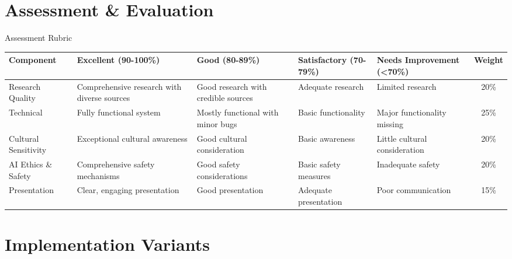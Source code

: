 \documentclass[aspectratio=169]{beamer}
\begin{document}
\section{Assessment \& Evaluation}

\begin{frame}{Assessment Rubric}
    \begin{table}
        \centering
        \tiny
        \begin{tabular}{|p{1.8cm}|p{1.8cm}|p{1.8cm}|p{1.8cm}|p{1.8cm}|c|}
            \hline
            \textbf{Component} & \textbf{Excellent (90-100\%)} & \textbf{Good (80-89\%)} & \textbf{Satisfactory (70-79\%)} & \textbf{Needs Improvement (<70\%)} & \textbf{Weight} \\
            \hline
            Research Quality & Comprehensive research with diverse sources & Good research with credible sources & Adequate research & Limited research & 20\% \\
            \hline
            Technical & Fully functional system & Mostly functional with minor bugs & Basic functionality & Major functionality missing & 25\% \\
            \hline
            Cultural Sensitivity & Exceptional cultural awareness & Good cultural consideration & Basic awareness & Little cultural consideration & 20\% \\
            \hline
            AI Ethics \& Safety & Comprehensive safety mechanisms & Good safety considerations & Basic safety measures & Inadequate safety & 20\% \\
            \hline
            Presentation & Clear, engaging presentation & Good presentation & Adequate presentation & Poor communication & 15\% \\
            \hline
        \end{tabular}
    \end{table}
\end{frame}

\section{Implementation Variants}
\end{document}

